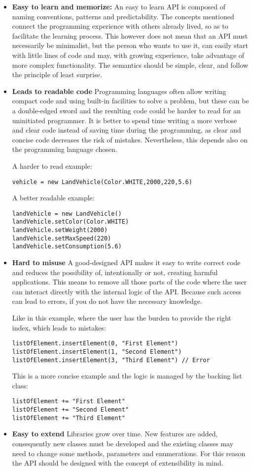 \documentclass[
	a4paper,					10pt,							twoside,					openright,				notitlepage,			parskip=half,			]{scrreprt}
\begin{document}
\begin{itemize}
\item{\textbf{Easy to learn and memorize:} 
An easy to learn \gls{API} is composed of naming conventions, patterns and predictability. 
The concepts mentioned connect the programming experience with others already lived, so as to facilitate the learning process. 
This however does not mean that an \gls{API} must necessarily be minimalist, but the person who wants to use it, 
can easily start with little lines of code and may, with growing experience, take advantage of more complex functionality. 
The semantics should be simple, clear, and follow the principle of least surprise.}

\item{\textbf{Leads to readable code} 
Programming languages often allow writing compact code and using built-in facilities to solve a problem, 
but these can be a double-edged sword and the resulting code could be harder to read for an uninitiated programmer.
It is better to spend time writing a more verbose and clear code instead of saving time during the programming, 
as clear and concise code decreases the risk of mistakes. Nevertheless, this depends also on the programming language chosen.

A harder to read example:
\begin{lstlisting}
vehicle = new LandVehicle(Color.WHITE,2000,220,5.6)
\end{lstlisting}
A better readable example:
\begin{lstlisting}
landVehicle = new LandVehicle()
landVehicle.setColor(Color.WHITE)
landVehicle.setWeight(2000)
landVehicle.setMaxSpeed(220)
landVehicle.setConsumption(5.6)
\end{lstlisting}
}

\item{\textbf{Hard to misuse} 
A good-designed \gls{API} makes it easy to write correct code and reduces the possibility of,
intentionally or not, creating harmful applications.
This means to remove all those parts of the code where the user can interact directly with the internal logic of the \gls{API}.
Because such access can lead to errors, if you do not have the necessary knowledge.

Like in this example, where the user has the burden to provide the right index, which leads to mistakes:
\begin{lstlisting}
listOfElement.insertElement(0, "First Element")
listOfElement.insertElement(1, "Second Element")
listOfElement.insertElement(3, "Third Element") // Error
\end{lstlisting}
\newpage
This is a more concise example and the logic is managed by the backing list class:
\begin{lstlisting}
listOfElement += "First Element"
listOfElement += "Second Element"
listOfElement += "Third Element"
\end{lstlisting}
}
\item{\textbf{Easy to extend} 
Libraries grow over time. New features are added, consequently new classes must be developed and the existing classes 
may need to change some methods, parameters and enumerations. For this reason the \gls{API} should be designed with the concept 
of extensibility in mind. }



\end{itemize}
\end{document}
